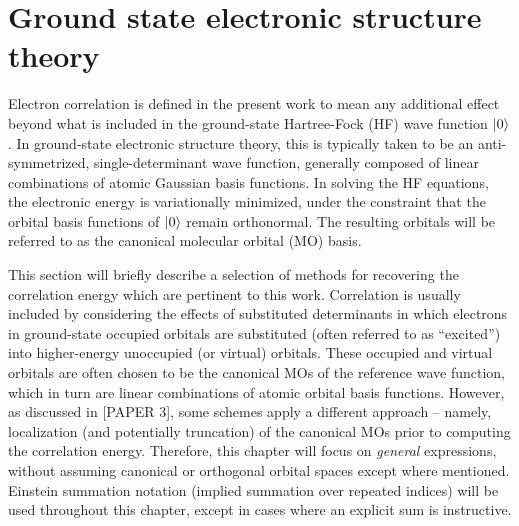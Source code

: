 \section{Ground state electronic structure theory} \label{se:est}
Electron correlation is defined in the present work to mean any additional
effect beyond what is included in the ground-state Hartree-Fock (HF)
wave function $| 0 \rangle$. In ground-state electronic structure theory,
this is typically taken to be an anti-symmetrized, single-determinant wave
function, generally composed of linear combinations of atomic Gaussian
basis functions. In solving the HF equations, the electronic energy
is variationally minimized, under the constraint that the orbital basis
functions of $| 0 \rangle$ remain orthonormal.\cite{Szabo1996} The resulting
orbitals will be referred to as the canonical molecular orbital (MO) basis.

This section will briefly describe a selection of methods for recovering
the correlation energy which are pertinent to this work. Correlation is
usually included by considering the effects of substituted determinants in
which electrons in ground-state occupied orbitals are substituted (often
referred to as ``excited'') into higher-energy unoccupied (or virtual)
orbitals. These occupied and virtual orbitals are often chosen to be the
canonical MOs of the reference wave function, which in turn are linear
combinations of atomic orbital basis functions. However, as discussed in
[PAPER 3], some schemes apply a different approach -- namely, localization
(and potentially truncation) of the canonical MOs prior to computing the
correlation energy. Therefore, this chapter will focus on \textit{general}
expressions, without assuming canonical or orthogonal orbital spaces
except where mentioned. Einstein summation notation (implied summation
over repeated indices) will be used throughout this chapter, except in
cases where an explicit sum is instructive.

